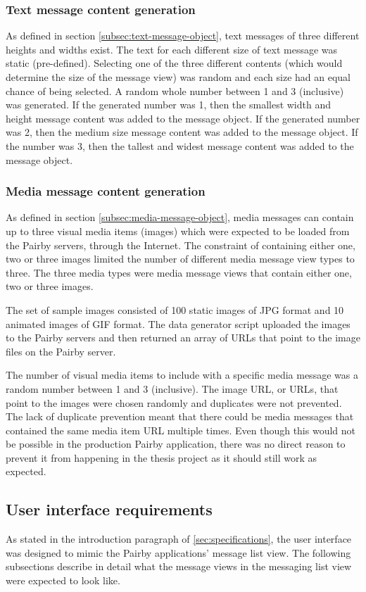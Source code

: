 \documentclass[a4paper,12pt]{article}
\begin{document}
\subsubsection{Text message content generation}
As defined in section \ref{subsec:text-message-object}, text messages of three different heights and widths exist. The text for each different size of text message was static (pre-defined). Selecting one of the three different contents (which would determine the size of the message view) was random and each size had an equal chance of being selected. A random whole number between 1 and 3 (inclusive) was generated. If the generated number was 1, then the smallest width and height message content was added to the message object. If the generated number was 2, then the medium size message content was added to the message object. If the number was 3, then the tallest and widest message content was added to the message object.

\subsubsection{Media message content generation}
As defined in section \ref{subsec:media-message-object}, media messages can contain up to three visual media items (images) which were expected to be loaded from the Pairby servers, through the Internet. The constraint of containing either one, two or three images limited the number of different media message view types to three. The three media types were media message views that contain either one, two or three images.

The set of sample images consisted of 100 static images of JPG format and 10 animated images of GIF format. The data generator script uploaded the images to the Pairby servers and then returned an array of URLs that point to the image files on the Pairby server.

The number of visual media items to include with a specific media message was a random number between 1 and 3 (inclusive). The image URL, or URLs, that point to the images were chosen randomly and duplicates were not prevented. The lack of duplicate prevention meant that there could be media messages that contained the same media item URL multiple times. Even though this would not be possible in the production Pairby application, there was no direct reason to prevent it from happening in the thesis project as it should still work as expected.

\subsection{User interface requirements}
As stated in the introduction paragraph of \autoref{sec:specifications}, the user interface was designed to mimic the Pairby applications' message list view. The following subsections describe in detail what the message views in the messaging list view were expected to look like.
\end{document}
